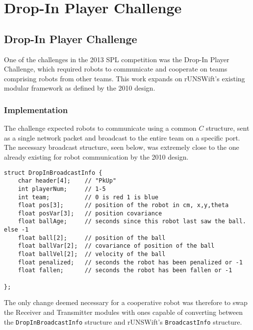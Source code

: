 \chapter{Drop-In Player Challenge}
\label{chap:misc}

\section{Drop-In Player Challenge}

One of the challenges in the 2013 SPL competition was the Drop-In Player Challenge, which required robots to communicate and cooperate on teams comprising robots from other teams. This work expands on rUNSWift's existing modular framework as defined by the 2010 design\cite{runswift_2010}.

\subsection{Implementation}

The challenge expected robots to communicate using a common $C$ structure, sent as a single network packet and broadcast to the entire team on a specific port. The necessary broadcast structure, seen below, was extremely close to the one already existing for robot communication by the 2010 design. 

\begin{lstlisting}
struct DropInBroadcastInfo {
    char header[4];    // "PkUp"
    int playerNum;     // 1-5
    int team;          // 0 is red 1 is blue
    float pos[3];      // position of the robot in cm, x,y,theta
    float posVar[3];   // position covariance
    float ballAge;     // seconds since this robot last saw the ball. else -1
    float ball[2];     // position of the ball
    float ballVar[2];  // covariance of position of the ball
    float ballVel[2];  // velocity of the ball
    float penalized;   // seconds the robot has been penalized or -1
    float fallen;      // seconds the robot has been fallen or -1

};
\end{lstlisting}

The only change deemed necessary for a cooperative robot was therefore to swap the Receiver and Transmitter modules with ones capable of converting between the \texttt{DropInBroadcastInfo} structure and rUNSWift's \texttt{BroadcastInfo} structure.

